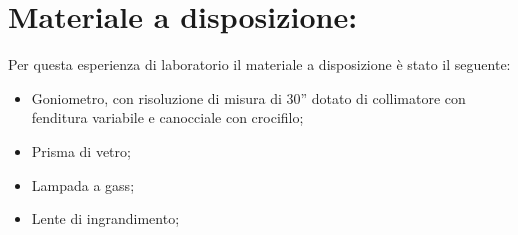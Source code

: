 \section{Materiale a disposizione:}

Per questa esperienza di laboratorio il materiale a disposizione è stato il seguente:
\begin{itemize}
	\item{Goniometro, con risoluzione di misura di 30'' dotato di collimatore con fenditura variabile e canocciale con crocifilo;}
    \item{Prisma di vetro;}
	\item{Lampada a gass;}
	\item{Lente di ingrandimento;}
\end{itemize}
